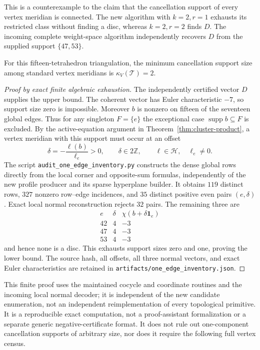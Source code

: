 This is a counterexample to the claim that the cancellation support of
every vertex meridian is connected.  The new algorithm with $k=2,r=1$
exhausts its restricted class without finding a disc, whereas $k=2,r=2$
finds $D$.  The incoming complete weight-space algorithm independently
recovers $D$ from the supplied support $\{47,53\}$.

\begin{proposition}
\label{prop:cluster-fixture-minimum}
For this fifteen-tetrahedron triangulation, the minimum cancellation
support size among standard vertex meridians is
$\kappa_V(\mathcal T)=2$.
\end{proposition}

\begin{proof}[Proof by exact finite algebraic exhaustion]
The independently certified vector $D$ supplies the upper bound.  The
coherent vector has Euler characteristic $-7$, so support size zero is
impossible.  Moreover $b$ is nonzero on fifteen of the seventeen global
edges.  Thus for any singleton $F=\{e\}$ the exceptional case
$\operatorname{supp}b\subseteq F$ is excluded.  By the active-equation
argument in Theorem~\ref{thm:cluster-product}, a vertex meridian with
this support must occur at an offset
\[
       \delta=-\frac{\ell(b)}{\ell_e}>0,
       \qquad \delta\in 2\mathbb Z,
       \qquad \ell\in\mathcal H,\quad \ell_e\ne0.
\]
The script \texttt{audit\_one\_edge\_inventory.py} constructs the dense
global rows directly from the local corner and opposite-sum formulas,
independently of the new profile producer and its sparse hyperplane
builder.  It obtains $119$ distinct rows, $327$ nonzero row--edge
incidences, and $35$ distinct positive even pairs $(e,\delta)$.  Exact
local normal reconstruction rejects $32$ pairs.  The remaining three
are
\[
\begin{array}{c|r|r}
e&\delta&\chi(b+\delta\mathbf 1_e)\\ \hline
42&4&-3\\
47&4&-3\\
53&4&-3
\end{array}
\]
and hence none is a disc.  This exhausts support sizes zero and one,
proving the lower bound.  The source hash, all offsets, all three normal
vectors, and exact Euler characteristics are retained in
\texttt{artifacts/one\_edge\_inventory.json}.
\end{proof}

This finite proof uses the maintained cocycle and coordinate routines
and the incoming local normal decoder; it is independent of the new
candidate enumeration, not an independent reimplementation of every
topological primitive.  It is a reproducible exact computation, not a
proof-assistant formalization or a separate generic negative-certificate
format.  It does not rule out one-component cancellation supports of
arbitrary size, nor does it require the following full vertex census.

